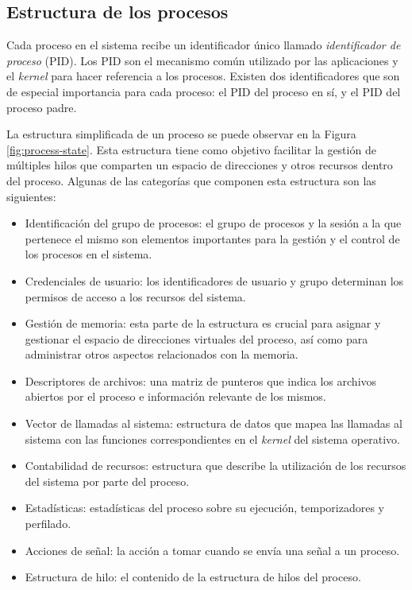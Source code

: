 \subsection{Estructura de los procesos}
Cada proceso en el sistema recibe un identificador único llamado \textit{identificador de proceso} (PID). Los PID son el mecanismo común utilizado por las aplicaciones y el \textit{kernel} para hacer referencia a los procesos. Existen dos identificadores que son de especial importancia para cada proceso: el PID del proceso en sí, y el PID del proceso padre.

La estructura simplificada de un proceso se puede observar en la Figura \ref{fig:process-state}. Esta estructura tiene como objetivo facilitar la gestión de múltiples hilos que comparten un espacio de direcciones y otros recursos dentro del proceso. Algunas de las categorías que componen esta estructura son las siguientes:

\begin{itemize}
    \item Identificación del grupo de procesos: el grupo de procesos y la sesión a la que pertenece el mismo son elementos importantes para la gestión y el control de los procesos en el sistema.
    \item Credenciales de usuario: los identificadores de usuario y grupo determinan los permisos de acceso a los recursos del sistema.
    \item Gestión de memoria: esta parte de la estructura es crucial para asignar y gestionar el espacio de direcciones virtuales del proceso, así como para administrar otros aspectos relacionados con la memoria.
    \item Descriptores de archivos: una matriz de punteros que indica los archivos abiertos por el proceso e información relevante de los mismos.
    \item Vector de llamadas al sistema: estructura de datos que mapea las llamadas al sistema con las funciones correspondientes en el \textit{kernel} del sistema operativo.
    \item Contabilidad de recursos: estructura que describe la utilización de los recursos del sistema por parte del proceso.
    \item Estadísticas: estadísticas del proceso sobre su ejecución, temporizadores y perfilado.
    \item Acciones de señal: la acción a tomar cuando se envía una señal a un proceso.
    \item Estructura de hilo: el contenido de la estructura de hilos del proceso.
\end{itemize}

